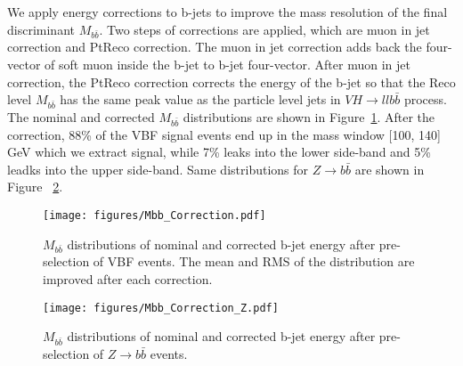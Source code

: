 We apply energy corrections to b-jets to improve the mass resolution of the final discriminant $M_{b\bar b}$. Two steps of corrections are applied, which are muon in jet correction and PtReco correction. The muon in jet correction adds back the four-vector of soft muon inside the b-jet to b-jet four-vector. After muon in jet correction, the PtReco correction corrects the energy of the b-jet so that the Reco level $M_{b \bar b}$ has the same peak value as the particle level jets in $VH \rightarrow llb \bar b$ process. The nominal and corrected $M_{b \bar b}$ distributions are shown in Figure~\ref{fig:MbbCorrection}. After the correction, 88\% of the VBF signal events end up in the mass window [100, 140] GeV which we extract signal, while 7\% leaks into the lower side-band and 5\% leadks into the upper side-band. Same distributions for $Z\rightarrow b \bar b$ are shown in Figure ~\ref{fig:MbbCorrection_Z}.

\begin{figure}[htbp]
  \centering
 \texttt{[image: figures/Mbb\_Correction.pdf]}

\caption{$M_{b \bar b}$ distributions of nominal and corrected b-jet energy after pre-selection of VBF events. The mean and RMS of the distribution are improved after each correction.  }
  \label{fig:MbbCorrection}
\end{figure}


\begin{figure}[htbp]
  \centering
 \texttt{[image: figures/Mbb\_Correction\_Z.pdf]}

\caption{$M_{b \bar b}$ distributions of nominal and corrected b-jet energy after pre-selection of $Z\rightarrow b \bar b$ events.}
  \label{fig:MbbCorrection_Z}
\end{figure}
